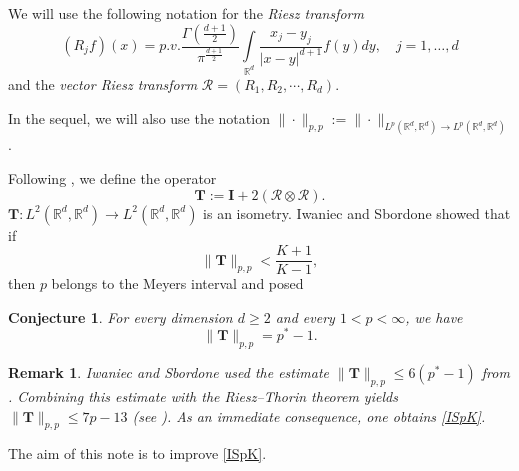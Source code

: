 \documentclass[12pt,reqno]{amsart}
\newtheorem{Conjecture}{Conjecture}
\newtheorem{remark}{Remark}
\newcommand{\R}{{\mathbb R}}
\newcommand{\RV}{{\mathcal R}}
\newcommand{\T}{{\mathbf T}}
\newcommand{\I}{{\mathbf I}}
\newcommand{\RO}{{\RV\otimes\RV}}
\begin{document}
\par
We will use the following notation for the \textit{Riesz transform}
$$(R_j f)(x) = p.v. \frac{\Gamma\left(\frac{d+1}{2}\right)}{\pi^{\frac{d+1}{2}}} \int\limits_{\R^d}\frac{x_j-y_j}{|x-y|^{d+1}}f(y)dy, \quad j=1,\ldots,d$$
and the \textit{vector Riesz transform} $\RV= \left(R_1,R_2,\cdots,R_d\right).$
\par
In the sequel, we will also use the notation $\|\cdot\|_{p,p}:=\|\cdot\|_{L^p(\R^d,\R^d)\to L^p(\R^d, \R^d)}$.
\par
Following \cite{IS2001}, we define the operator
$$\T:=\I+2(\RO). $$
$\T:L^2(\R^d,\R^d)\to L^2(\R^d,\R^d)$ is an isometry.
Iwaniec and Sbordone \cite[Section 11]{IS2001} showed that if
\begin{equation}\label{KBound}
\|\mathbf T\|_{p,p} < \frac{K+1}{K-1},
\end{equation}
then $p$ belongs to the Meyers interval and posed
\begin{Conjecture}\label{Conj91}\cite[Conjecture 9.1]{IS2001}
For every dimension $d \geq 2$ and every $1<p<\infty$, we have
$$\|\T\|_{p,p}=p^*-1. $$
\end{Conjecture}
\begin{remark}
Iwaniec and Sbordone used the estimate $\|\T\|_{p,p}\leq 6(p^*-1)$ from  \cite[Theorem 1]{BL}.
Combining this estimate with the Riesz--Thorin theorem yields $\|\T\|_{p,p}\leq 7p-13$ (see \cite[Lemma 9.1]{IS2001}).
As an immediate consequence, one obtains \eqref{ISpK}.
\end{remark}
The aim of this note is to improve \eqref{ISpK}.
\end{document}
